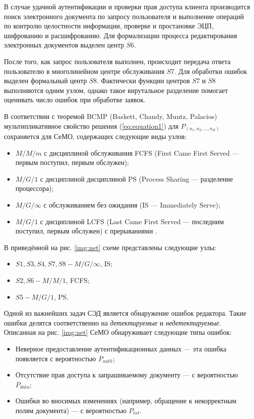 \vspace{\baselineskip}
В случае удачной аутентификации и проверки прав доступа клиента производится поиск электронного документа по запросу пользователя и выполнение операций по контролю целостности информации, проверке и простановке ЭЦП, шифрованию и расшифрованию. Для формализации процесса редактирования электронных документов выделен центр $S6$.

После того, как запрос пользователя выполнен, происходит передача ответа пользователю в многолинейном центре обслуживания $S7$.
Для обработки ошибок выделен формальный центр $S8$. Фактически функции центров $S7$ и $S8$ выполняются одним узлом, однако такое вирутальное разделение помогает оценивать число ошибок при обработке заявок.

\vspace{\baselineskip}
В соответствии с теоремой BCMP (Baskett, Chandy, Muntz, Palacios) мультипликативное свойство решения (\ref{eq:equation1}) для $P_(n_1,n_2,\ldots,n_R)$ сохраняется для СеМО, содержащих следующие виды узлов:
\begin{itemize}
  \item $M/M/m$ с дисциплиной обслуживания FCFS (First Came First Served --- первым поступил, первым обслужен);
  \item $M/G/1$ с дисциплиной дисциплиной PS (Process Sharing --- разделение процессора);
  \item $M/G/\infty$ с обслуживанием без ожидания (IS --- Immediately Serve);
  \item $M/G/1$ с дисциплиной LCFS (Last Came First Served --- последним поступил, первым обслужен) с прерываниями \cite{vishnevsky}.
\end{itemize}

В приведённой на рис. \ref{img:net} схеме представлены следующие узлы:
\begin{itemize}
  \item $S1, S3, S4, S7, S8 - M/G/\infty$, IS;
  \item $S2, S6 - M/M/1$, FCFS;
  \item $S5 - M/G/1$, PS.\cite{bykov}
\end{itemize}

Одной из важнейших задач СЭД является обнаружение ошибок редактора. Такие ошибки делятся соответственно на \textit{детектируемые} и \textit{недетектируемые}.
Описанная на рис. \ref{img:net} СеМО обнаруживает следующие типы ошибок:
\begin{itemize}
  \item Неверное предоставление аутентификационных данных --- эта ошибка появляется с вероятностью $P_{auth}$;
  \item Отсутствие прав доступа к запрашиваемому документу --- с вероятностью $P_{data}$;
  \item Ошибки во вносимых изменениях (например, обращение к некорректным полям документа) --- с вероятностью $P_{txt}$.
\end{itemize}

